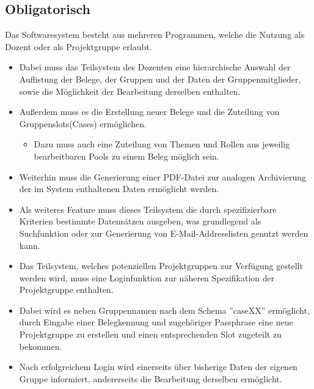\documentclass{article}
\begin{document}
\subsection{Obligatorisch}
Das Softwaresystem besteht aus mehreren Programmen, welche die Nutzung als Dozent oder als Projektgruppe erlaubt.

\begin{itemize}
\item Dabei muss das Teilsystem des Dozenten eine hierarchische Auswahl der Auflistung der Belege, der Gruppen und der Daten der Gruppenmitglieder, sowie die Möglichkeit der Bearbeitung derselben enthalten.

\item Außerdem muss es die Erstellung neuer Belege und die Zuteilung von Gruppenslots(Cases) ermöglichen.

\begin{itemize}
\item Dazu muss auch eine Zuteilung von Themen und Rollen aus jeweilig bearbeitbaren Pools zu einem Beleg möglich sein.
\end{itemize}

\item Weiterhin muss die Generierung einer PDF-Datei zur analogen Archivierung der im System enthaltenen Daten ermöglicht werden.

\item Als weiteres Feature muss dieses Teilsystem die durch spezifizierbare Kriterien bestimmte Datensätzen ausgeben, was grundlegend als Suchfunktion oder zur Generierung von E-Mail-Addresslisten genutzt werden kann.
\end{itemize}

\begin{itemize}
\item Das Teilsystem, welches potenziellen Projektgruppen zur Verfügung gestellt werden wird, muss eine Loginfunktion zur näheren Spezifikation der Projektgruppe enthalten.

\item Dabei wird es neben Gruppennamen nach dem Schema ''caseXX'' ermöglicht, durch Eingabe einer Belegkennung und zugehöriger Passphrase eine neue Projektgruppe zu erstellen und einen entsprechenden Slot zugeteilt zu bekommen.

\item Nach erfolgreichem Login wird einerseits über bisherige Daten der eigenen Gruppe informiert, andererseits die Bearbeitung derselben ermöglicht.
\end{itemize}
\end{document}
